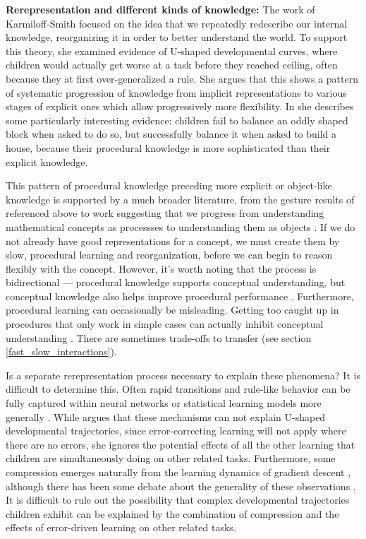 \textbf{Rerepresentation and different kinds of knowledge:} The work of Karmiloff-Smith \citep[e.g.][]{Karmiloff-Smith1986, Karmiloff-Smith1992, Clark1993} focused on the idea that we repeatedly redescribe our internal knowledge, reorganizing it in order to better understand the world. To support this theory, she examined evidence of U-shaped developmental curves, where children would actually get worse at a task before they reached ceiling, often because they at first over-generalized a rule. She argues that this shows a pattern of systematic progression of knowledge from implicit representations to various stages of explicit ones which allow progressively more flexibility. In \citet{Karmiloff-Smith1986} she describes some particularly interesting evidence: children fail to balance an oddly shaped block when asked to do so, but successfully balance it when asked to build a house, because their procedural knowledge is more sophisticated than their explicit knowledge. \par 
This pattern of procedural knowledge preceding more explicit or object-like knowledge is supported by a much broader literature, from the gesture results of \citet{Goldin-Meadow1993} referenced above to work suggesting that we progress from understanding mathematical concepts as processses to understanding them as objects \citep{Dubinsky1991, Hazzan1999}. If we do not already have good representations for a concept, we must create them by slow, procedural learning and reorganization, before we can begin to reason flexibly with the concept. However, it's worth noting that the process is bidirectional --- procedural knowledge supports conceptual understanding, but conceptual knowledge also helps improve procedural performance \citep{Rittle-Johnson2001}. Furthermore, procedural learning can occasionally be misleading. Getting too caught up in procedures that only work in simple cases can actually inhibit conceptual understanding \citep{McNeil2005}. There are sometimes trade-offs to transfer (see section \ref{fast_slow_interactions}). \par 
Is a separate rerepresentation process necessary to explain these phenomena? It is difficult to determine this. Often rapid transitions and rule-like behavior can be fully captured within neural networks or statistical learning models more generally \citep[e.g.][]{McClelland1999, McClelland2002, Schapiro2009, Aslin2012}. While \citet{Karmiloff-Smith1992} argues that these mechanisms can not explain U-shaped developmental trajectories, since error-correcting learning will not apply where there are no errors, she ignores the potential effects of all the other learning that children are simultaneously doing on other related tasks. Furthermore, some compression emerges naturally from the learning dynamics of gradient descent \citep{Tishby2015, Shwartz-Ziv2017, Achille2017}, although there has been some debate about the generality of these observations \citep[e.g.][]{Saxe2018a}. It is difficult to rule out the possibility that complex developmental trajectories children exhibit can be explained by the combination of compression and the effects of error-driven learning on other related tasks. \par
